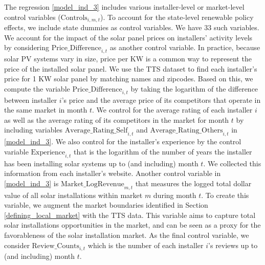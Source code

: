 \documentclass[msom,blindrev]{informs3}
\begin{document}
	
	The regression \eqref{model_ind_3} includes various installer-level or market-level control variables ($\text{Controls}_{i,m,t}$).  To account for the state-level renewable policy effects, we include state dummies as control variables. We have 33 such variables. We account for the impact of the solar panel prices on installers' activity levels by considering $\text{Price\_Difference}_{i,t}$ as another control variable.  In practice, because solar PV systems vary in size, price per KW is a common way to represent the price of the installed solar panel. We use the TTS dataset to find each installer's price for 1 KW solar panel by matching names and zipcodes. Based on this, we compute the variable $\text{Price\_Difference}_{i,t}$ by taking the logarithm of the difference between installer $i$'s price and the average price of its competitors that operate in the same market in month $t$.  We control for the average rating of each installer $i$ as well as the average rating of its competitors in the market for month $t$ by including variables $\text{Average\_Rating\_Self}_{i,t}$ and $\text{Average\_Rating\_Others}_{i,t}$ in \eqref{model_ind_3}. We also control for the installer's experience by the control variable $\text{Experience}_{i,t}$ that is the logarithm of the number of years the installer has been installing solar systems up to (and including) month $t$. We collected this information from each installer's website. Another control variable in \eqref{model_ind_3} is $\text{Market\_LogRevenue}_{m,t}$  that measures the logged total dollar value of all solar installations within market $m$ during month $t$. To create this variable, we augment the market boundaries identified in Section \ref{defining_local_market} with the TTS data. This variable aims to capture total solar installations opportunities in the market, and can be seen as a proxy for the favorableness of the solar installation market. As the final control variable, we consider  $\text{Review\_Counts}_{i,t}$ which is the number of each installer $i$'s reviews up to (and including) month $t$.
	
	
	
	
	
	
\end{document}
